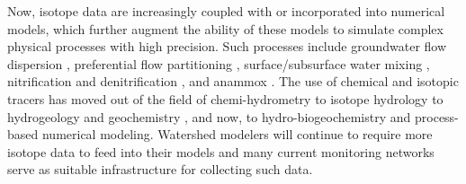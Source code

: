 \documentclass[preprint,review, 12pt]{elsarticle}
\begin{document}
    Now, isotope data are increasingly coupled with or incorporated into numerical models, which further augment the ability of these models to simulate complex physical processes with high precision. Such processes include groundwater flow dispersion \citep{Cornaton2011, Jiang2019}, preferential flow partitioning \citep{VanderHoven2002, Dusek2018}, surface/subsurface water mixing \citep{Turner2006}, nitrification and denitrification \citep{Choi2003, Chen2004, Rutting2007}, and anammox \citep{Granger2016}. The use of chemical and isotopic tracers has moved out of the field of chemi-hydrometry \citep{Groat1915} to isotope hydrology \citep{Agency} to hydrogeology and geochemistry \citep{Agency1974}, and now, to hydro-biogeochemistry and process-based numerical modeling.  Watershed modelers will continue to require more isotope data to feed into their models and many current monitoring networks serve as suitable infrastructure for collecting such data. 

\end{document}
